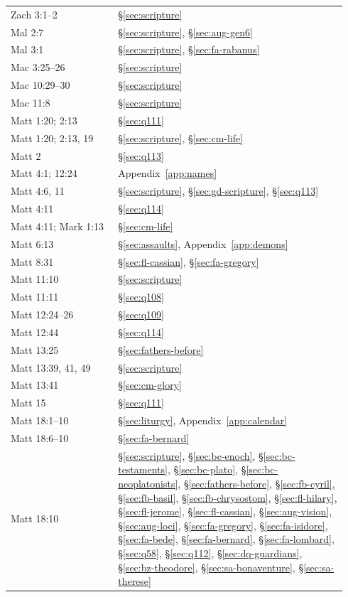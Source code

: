 \begin{longtable}{>{\raggedright\arraybackslash}p{0.30\linewidth}>{\raggedright\arraybackslash}p{0.64\linewidth}}
Zach 3:1--2 & \S\ref{sec:scripture}\\
Mal 2:7 & \S\ref{sec:scripture}, \S\ref{sec:aug-gen6}\\
Mal 3:1 & \S\ref{sec:scripture}, \S\ref{sec:fa-rabanus}\\
2 Mac 3:25--26 & \S\ref{sec:scripture}\\
2 Mac 10:29--30 & \S\ref{sec:scripture}\\
2 Mac 11:8 & \S\ref{sec:scripture}\\
Matt 1:20; 2:13 & \S\ref{sec:q111}\\
Matt 1:20; 2:13, 19 & \S\ref{sec:scripture}, \S\ref{sec:cm-life}\\
Matt 2 & \S\ref{sec:q113}\\
Matt 4:1; 12:24 & Appendix~\ref{app:names}\\
Matt 4:6, 11 & \S\ref{sec:scripture}, \S\ref{sec:gd-scripture}, \S\ref{sec:q113}\\
Matt 4:11 & \S\ref{sec:q114}\\
Matt 4:11; Mark 1:13 & \S\ref{sec:cm-life}\\
Matt 6:13 & \S\ref{sec:assaults}, Appendix~\ref{app:demons}\\
Matt 8:31 & \S\ref{sec:fl-cassian}, \S\ref{sec:fa-gregory}\\
Matt 11:10 & \S\ref{sec:scripture}\\
Matt 11:11 & \S\ref{sec:q108}\\
Matt 12:24--26 & \S\ref{sec:q109}\\
Matt 12:44 & \S\ref{sec:q114}\\
Matt 13:25 & \S\ref{sec:fathers-before}\\
Matt 13:39, 41, 49 & \S\ref{sec:scripture}\\
Matt 13:41 & \S\ref{sec:cm-glory}\\
Matt 15 & \S\ref{sec:q111}\\
Matt 18:1--10 & \S\ref{sec:liturgy}, Appendix~\ref{app:calendar}\\
Matt 18:6--10 & \S\ref{sec:fa-bernard}\\
Matt 18:10 & \S\ref{sec:scripture}, \S\ref{sec:bc-enoch}, \S\ref{sec:bc-testaments}, \S\ref{sec:bc-plato}, \S\ref{sec:bc-neoplatonists}, \S\ref{sec:fathers-before}, \S\ref{sec:fb-cyril}, \S\ref{sec:fb-basil}, \S\ref{sec:fb-chrysostom}, \S\ref{sec:fl-hilary}, \S\ref{sec:fl-jerome}, \S\ref{sec:fl-cassian}, \S\ref{sec:aug-vision}, \S\ref{sec:aug-loci}, \S\ref{sec:fa-gregory}, \S\ref{sec:fa-isidore}, \S\ref{sec:fa-bede}, \S\ref{sec:fa-bernard}, \S\ref{sec:fa-lombard}, \S\ref{sec:q58}, \S\ref{sec:q112}, \S\ref{sec:dq-guardians}, \S\ref{sec:bz-theodore}, \S\ref{sec:sa-bonaventure}, \S\ref{sec:sa-therese}\\

\end{longtable}

